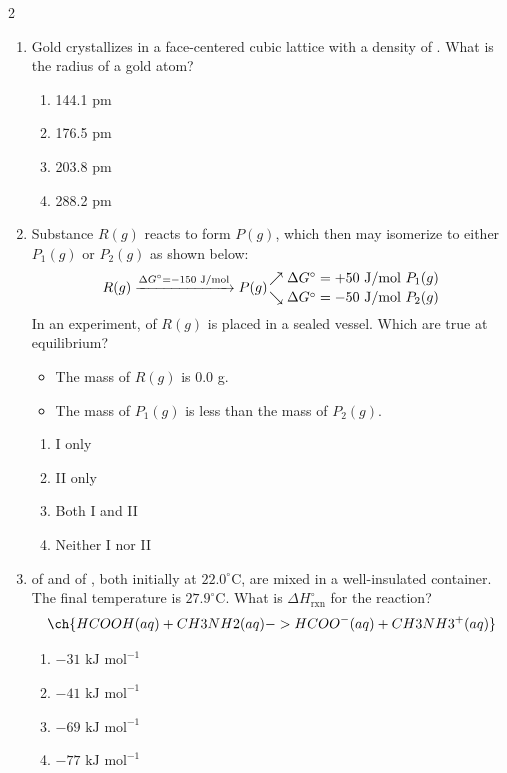 \documentclass[10pt,letterpaper]{article}
\begin{document}
\begin{multicols*}{2}
\begin{enumerate}
    \item Gold crystallizes in a face-centered cubic lattice with a density of . What is the radius of a gold atom?
    \begin{enumerate}[label=(\textsubscript{\Alph*})]
        \item 144.1 pm
        \item 176.5 pm
        \item 203.8 pm
        \item 288.2 pm
    \end{enumerate}

    \item Substance $R(g)$ reacts to form $P(g)$, which then may isomerize to either $P_1(g)$ or $P_2(g)$ as shown below:
    \[ R(g) \xrightarrow{\Delta G^\circ = -150\text{ J/mol}} P(g) \genfrac{}{}{0pt}{}{\nearrow \Delta G^\circ = +50\text{ J/mol } P_1(g)}{\searrow \Delta G^\circ = -50\text{ J/mol } P_2(g)} \]
    In an experiment,  of $R(g)$ is placed in a sealed vessel. Which are true at equilibrium?
    \begin{itemize}
        \item[I.] The mass of $R(g)$ is 0.0 g.
        \item[II.] The mass of $P_1(g)$ is less than the mass of $P_2(g)$.
    \end{itemize}
    \begin{enumerate}[label=(\textsubscript{\Alph*})]
        \item I only
        \item II only
        \item Both I and II
        \item Neither I nor II
    \end{enumerate}

    \item {} of   and  of  , both initially at $22.0^\circ\text{C}$, are mixed in a well-insulated container. The final temperature is $27.9^\circ\text{C}$. What is $\Delta H^\circ_{\text{rxn}}$ for the reaction?
    \[ \ch{HCOOH(aq) + CH3NH2(aq) -> HCOO^{-}(aq) + CH3NH3^{+}(aq)} \]
    \begin{enumerate}[label=(\textsubscript{\Alph*})]
        \item $-31\text{ kJ mol}^{-1}$
        \item $-41\text{ kJ mol}^{-1}$
        \item $-69\text{ kJ mol}^{-1}$
        \item $-77\text{ kJ mol}^{-1}$
    \end{enumerate}


\end{enumerate}
\end{multicols*}
\end{document}
